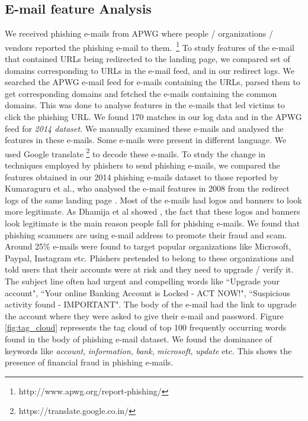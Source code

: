 \documentclass[conference]{IEEEtran}
\begin{document}
\subsection{E-mail feature Analysis}
We received phishing e-mails from APWG where people / organizations / vendors reported the phishing e-mail to them.~\footnote{http://www.apwg.org/report-phishing/} To study features of the e-mail that contained URLs being redirected to the landing page, we compared set of domains corresponding to URLs in the e-mail feed, and in our redirect logs. We searched the APWG e-mail feed for e-mails containing the URLs, parsed them to get corresponding domains and fetched the e-mails containing the common domains. This was done to analyse features in the e-mails that led victims to click the phishing URL. We found 170 matches in our log data and in the APWG feed for \textit{2014 dataset}. We manually examined these e-mails and analysed the features in these e-mails. Some e-mails were present in different language. We used Google translate \footnote{https://translate.google.co.in/} to decode these e-mails. To study the change in techniques employed by phishers to send phishing e-mails, we compared the features obtained in our 2014 phishing e-mails dataset to those reported by Kumaraguru et al., who analysed the e-mail features in 2008 from the redirect logs of the same landing page \cite{pk-404}.
\newline\indent
Most of the e-mails had logos and banners to look more legitimate. As Dhamija et al showed \cite{dhamija}, the fact that these logos and banners look legitimate is the main reason people fall for phishing e-mails. We found that phishing scammers are using e-mail address to promote their fraud and scam. Around 25\% e-mails were found to target popular organizations like Microsoft, Paypal, Instagram etc. Phishers pretended to belong to these organizations and told users that their accounts were at risk and they need to upgrade / verify it. The subject line often had urgent and compelling words like ``Upgrade your account", ``Your online Banking Account is Locked - ACT NOW!", ``Suspicious activity found - IMPORTANT". The body of the e-mail had the link to upgrade the account where they were asked to give their e-mail and password. Figure \ref{fig:tag_cloud} represents the tag cloud of top 100 frequently occurring words found in the body of phishing e-mail dataset. We found the dominance of keywords like \textit{account}, \textit{information}, \textit{bank}, \textit{microsoft}, \textit{update} etc. This shows the presence of financial fraud in phishing e-mails.
\end{document}
